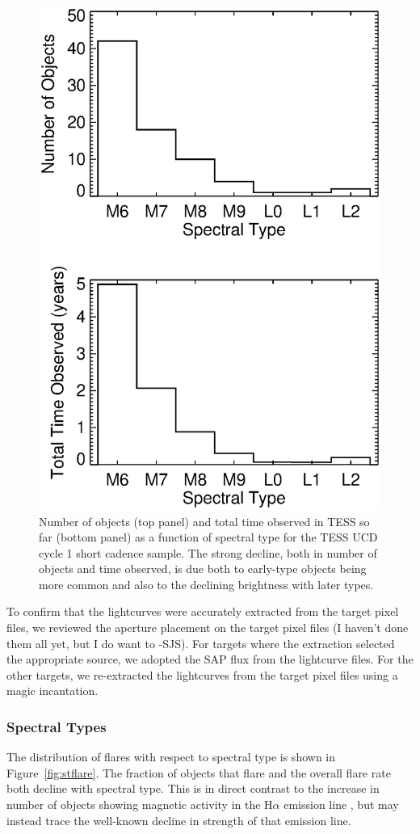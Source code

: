 \documentclass{aastex62}
\begin{document}
\begin{figure}
	\includegraphics[width=0.5\columnwidth]{ST_stats.eps}
    \caption{Number of objects (top panel) and total time observed in TESS so far (bottom panel) as a function of spectral type for the TESS UCD cycle 1 short cadence sample. The strong decline, both in number of objects and time observed, is due both to early-type objects being more common and also to the declining brightness with later types.}
    \label{fig:ststat}
\end{figure}

To confirm that the lightcurves were accurately extracted from the target pixel files, we reviewed the aperture placement on the target pixel files (I haven't done them all yet, but I do want to -SJS). For targets where the extraction selected the appropriate source, we adopted the SAP flux from the lightcurve files. For the other targets, we re-extracted the lightcurves from the target pixel files using a magic incantation. 

\subsubsection{Spectral Types}
The distribution of flares with respect to spectral type is shown in Figure~\ref{fig:stflare}. The fraction of objects that flare and the overall flare rate both decline with spectral type. This is in direct contrast to the increase in number of objects showing magnetic activity in the H$\alpha$ emission line \citep{Schmidt2015}, but may instead trace the well-known decline in strength of that emission line. 
\end{document}
